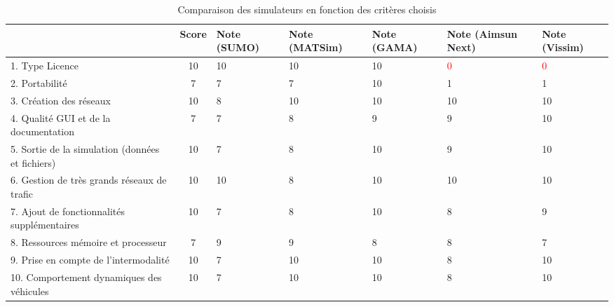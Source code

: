 \begin{table}[!ht]
\begin{center}
\caption{Comparaison des simulateurs en fonction des critères choisis \label{tab:compaSim}}
\begin{tabular}{|p{3.8cm}|c|p{1.5cm}|p{1.75cm}|p{1.5cm}|p{1.75cm}|p{1.5cm}|}
\hline
 \textbf{}  & \footnotesize \textbf{Score} & \footnotesize \textbf{Note (SUMO)} & \footnotesize  \textbf{Note (MATSim)} &\footnotesize \textbf{Note (GAMA)}&\footnotesize \textbf{Note (Aimsun Next)}&\footnotesize \textbf{Note (Vissim)} \\
\hline
 {\footnotesize 1. Type Licence}  & \footnotesize 10 & \footnotesize  10 & \footnotesize  10 & \footnotesize 10  &  \footnotesize \textcolor{red}{0} & \footnotesize \textcolor{red}{0}\\
\hline
\footnotesize 2. Portabilité  & \footnotesize 7 & \footnotesize 7 
& \footnotesize 7 & \footnotesize 10  & \footnotesize 1 & \footnotesize 1
\\ 
\hline
\footnotesize 3. Création des réseaux  & \footnotesize 10 & \footnotesize 8 
&  \footnotesize 10  & \footnotesize 10
& \footnotesize 10
& \footnotesize 10
\\ 
\hline
\footnotesize 4. Qualité GUI et de la documentation & \footnotesize 7 & \footnotesize 7 & \footnotesize 8  & \footnotesize 9 & \footnotesize 9 &  \footnotesize 10
\\ 
\hline
\footnotesize 5. Sortie de la simulation (données et fichiers)  & \footnotesize 10 & \footnotesize 7  & \footnotesize 8 & \footnotesize 10 & \footnotesize 9 & \footnotesize 10
\\ 
\hline
\footnotesize 6. Gestion de très grands réseaux de trafic  & \footnotesize  10 & \footnotesize  10  & \footnotesize 8   & \footnotesize 10 & \footnotesize 10 & \footnotesize 10
\\ 
\hline
\footnotesize 7. Ajout de fonctionnalités supplémentaires  & \footnotesize 10 &  \footnotesize 7  & \footnotesize  8  & \footnotesize 10 & \footnotesize 8 & \footnotesize 9
\\ 
\hline
\footnotesize 8. Ressources mémoire et processeur  & \footnotesize 7 & \footnotesize 9 & \footnotesize  9  & \footnotesize 8 & \footnotesize 8 & \footnotesize 7
\\ 
\hline
\footnotesize 9. Prise en compte de l'intermodalité  & \footnotesize 10 & \footnotesize 7  & \footnotesize 10  & \footnotesize 10 & \footnotesize 8 & \footnotesize 10
\\ 
\hline
\footnotesize 10. Comportement dynamiques des véhicules  & \footnotesize 10 & \footnotesize  7 & \footnotesize 10  & \footnotesize 10 & \footnotesize 8 & \footnotesize 10


\end{tabular}
\end{center}
\end{table}
